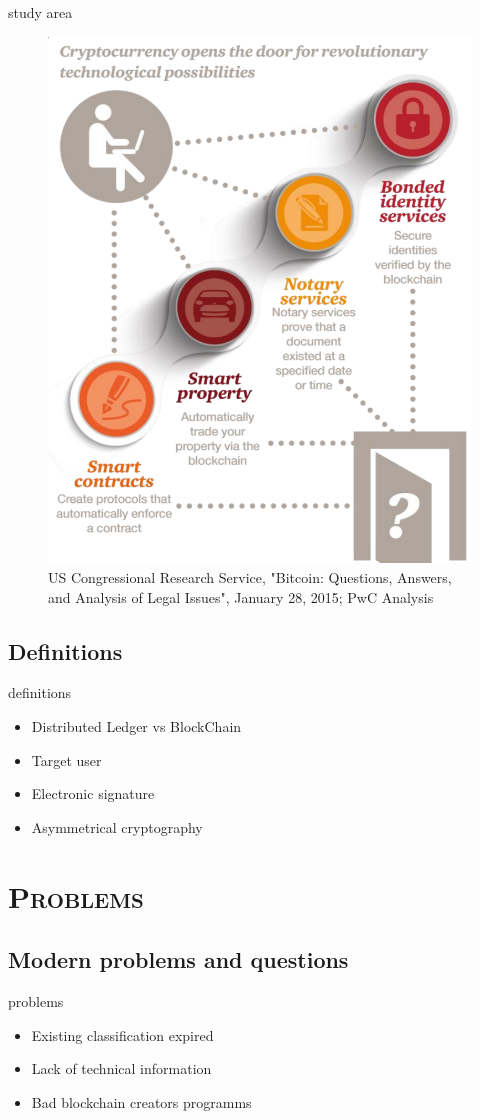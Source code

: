 \documentclass[xcolor=x11names,compress]{beamer}
\renewcommand{\(}{\begin{columns}}
\renewcommand{\)}{\end{columns}}
\newcommand{\<}[1]{\begin{column}{#1}}
\renewcommand{\>}{\end{column}}
\begin{document}
\begin{frame}{study area}
    \begin{figure}
        \includegraphics[height=0.6\textwidth]{./images/possibilities}
        \caption{\tiny US Congressional Research Service, "Bitcoin: Questions, Answers, and Analysis of Legal Issues", January 28, 2015; PwC Analysis}
    \end{figure}
\end{frame}

\subsection{Definitions}
\begin{frame}{definitions}
    \begin{itemize}
        \item Distributed Ledger vs BlockChain
        \item Target user
        \item Electronic signature
        \item Asymmetrical cryptography
    \end{itemize}
\end{frame}


\section{\scshape Problems} %
\subsection{Modern problems and questions}
\begin{frame}{problems}
\begin{itemize}
        \item Existing classification expired
        \item Lack of technical information
        \item Bad blockchain creators programms
\end{itemize}
\end{frame}
\end{document}
